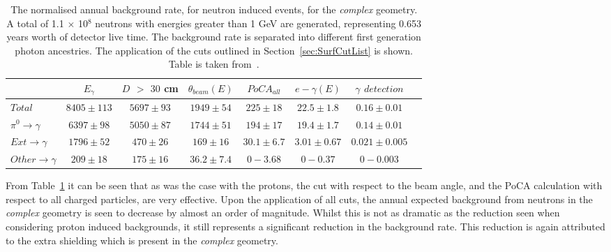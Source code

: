 \begin{table}
  \caption[The normalised annual background rate, for neutron induced events, for the \emph{complex} geometry]
          {The normalised annual background rate, for neutron induced events, for the \emph{complex} geometry. A total of 1.1 $\times$ 10$^8$ neutrons with energies greater than 1 GeV are generated, representing 0.653 years worth of detector live time. The background rate is separated into different first generation photon ancestries. The application of the cuts outlined in Section~\ref{sec:SurfCutList} is shown. Table is taken from~\citep{MartinsThesis}.}
  \label{tab:SurfNeuComp}
  \centering
  \scriptsize
  \begin{tabular}{l c c c c c c c }
    \toprule
        & $E_\gamma$ &  $D$ $>$ $30$ cm & $\theta_{beam}(E)$ & $PoCA_{all}$ & $e-\gamma(E)$ & $\gamma$ $detection$ \\
        \midrule
        $Total$          & $8405\pm113$ & $5697\pm93$ & $1949\pm54$  & $225\pm18$   & $22.5\pm1.8$  & $0.16\pm0.01$ \\

        $\pi^0\to\gamma$ & $6397\pm98$  & $5050\pm87$ & $1744\pm51$  & $194\pm17$   & $19.4\pm1.7$  & $0.14\pm0.01$ \\

        $Ext\to\gamma$   & $1796\pm52$  & $470\pm26$  & $169\pm16$   & $30.1\pm6.7$ & $3.01\pm0.67$ & $0.021\pm0.005$ \\

        $Other\to\gamma$ & $209\pm18$   & $175\pm16$  & $36.2\pm7.4$ & $0-3.68$     & $0-0.37$      & $0-0.003$ \\
        \bottomrule
  \end{tabular}
\end{table}

From Table~\ref{tab:SurfNeuComp} it can be seen that as was the case with the protons, the cut with respect to the beam angle, and the PoCA calculation with respect to all charged particles, are very effective. Upon the application of all cuts, the annual expected background from neutrons in the \emph{complex} geometry is seen to decrease by almost an order of magnitude. Whilst this is not as dramatic as the reduction seen when considering proton induced backgrounds, it still represents a significant reduction in the background rate. This reduction is again attributed to the extra shielding which is present in the \emph{complex} geometry. \\

